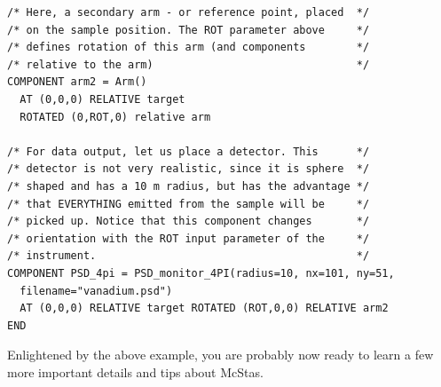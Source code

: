 \documentclass[a4paper]{article}
\begin{document}
\begin{verbatim}
/* Here, a secondary arm - or reference point, placed  */
/* on the sample position. The ROT parameter above     */
/* defines rotation of this arm (and components        */
/* relative to the arm)                                */
COMPONENT arm2 = Arm() 
  AT (0,0,0) RELATIVE target
  ROTATED (0,ROT,0) relative arm

/* For data output, let us place a detector. This      */
/* detector is not very realistic, since it is sphere  */
/* shaped and has a 10 m radius, but has the advantage */
/* that EVERYTHING emitted from the sample will be     */
/* picked up. Notice that this component changes       */
/* orientation with the ROT input parameter of the     */
/* instrument.                                         */
COMPONENT PSD_4pi = PSD_monitor_4PI(radius=10, nx=101, ny=51,
  filename="vanadium.psd")
  AT (0,0,0) RELATIVE target ROTATED (ROT,0,0) RELATIVE arm2
END
\end{verbatim}
Enlightened by the above example, you are probably now ready to learn
a few more important details and tips about McStas.
\end{document}
